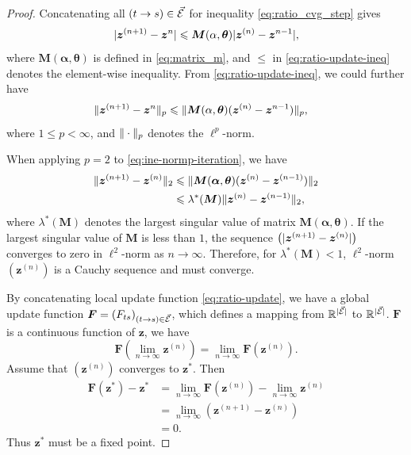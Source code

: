 \begin{proof}
  
  Concatenating all $(t\rightarrow s) \in \vec{\mathcal{E}}$ for inequality \eqref{eq:ratio_cvg_step} gives
  \begin{equation}\label{eq:ratio-update-ineq}
    | \bm{z}^{(n+1)} - \bm{z}^{n} | \leqslant \bm{M}(\alpha, \bm{\theta})| \bm{z}^{(n)} - \bm{z}^{n-1} |,
  \end{equation}
  where $\bm{M}(\bm{\alpha}, \bm{\theta})$ is defined in \eqref{eq:matrix_m}, and $\leq$ in \eqref{eq:ratio-update-ineq} denotes the element-wise inequality. From \eqref{eq:ratio-update-ineq}, we could further have
  \begin{align}\label{eq:ine-normp-iteration}
    \| \bm{z}^{(n+1)} - \bm{z}^{n} \|_{p} &\leqslant \| \bm{M}(\alpha, \bm{\theta})(\bm{z}^{(n)} - \bm{z}^{n-1}) \|_{p},               
  \end{align}
  where $1\leq p < \infty$, and $\| \cdot \|_p$ denotes the ${\ell}^p$-norm.

  When applying $p=2$ to \eqref{eq:ine-normp-iteration}, we have
  \begin{align}\label{eq:ieq-largest-singular}
    \| \bm{z}^{(n+1)} - \bm{z}^{(n)} \|_{2} &\leqslant \| \bm{M}(\bm{\alpha}, \bm{\theta})(\bm{z}^{(n)} - \bm{z}^{(n-1)}) \|_{2} \nonumber \\
                                          &\leqslant \lambda^{\ast}(\bm{M})\| \bm{z}^{(n)} - \bm{z}^{(n-1)} \|_{2},
  \end{align}
  where $\lambda^{\ast}(\bm{M})$ denotes the largest singular value of matrix
  $\bm{M}(\bm{\alpha}, \bm{\theta})$. If the largest singular value of $\bm{M}$ is less than $1$, the sequence
  $\left( | \bm{z}^{(n+1)} - \bm{z}^{(n)} |\right)$ converges to zero in $\ell^2$-norm as $n \rightarrow \infty$. Therefore, for $\lambda^{\ast}(\bm{M})<1$, $\ell^2$-norm $\left(  \bm{z}^{(n)}  \right)$ is a Cauchy sequence and must converge. 

  By concatenating local update function \eqref{eq:ratio-update}, we have a global update function $\bm{F} = \left(  F_{ts}  \right)_{ (t \rightarrow s) \in \vec{\mathcal{E}}}$, which defines a mapping from $\mathbb{R}^{| \vec{\mathcal{E}} |}$ to $\mathbb{R}^{| \vec{\mathcal{E}} |}$. $\bm{F}$ is a continuous function of $\bm{z}$, we have
  \begin{equation}
    \bm{F}(\lim_{n\rightarrow \infty}\bm{z}^{(n)}) = \lim_{n\rightarrow \infty}\bm{F}(\bm{z}^{(n)}).
  \end{equation}
  Assume that $\left(  \bm{z}^{(n)} \right)$ converges to
  $\bm{z}^{\ast}$. Then
  \begin{align}
    \bm{F}(\bm{z}^{\ast}) - \bm{z}^{\ast}
    &= \lim_{n\rightarrow \infty} \bm{F}(\bm{z}^{(n)}) -\lim_{n\rightarrow
      \infty} \bm{z}^{(n)} \nonumber \\
    &= \lim_{n\rightarrow \infty} (\bm{z}^{(n+1)} - \bm{z}^{(n)}) \nonumber \\
    &= 0.
  \end{align}
  Thus $\bm{z}^{\ast}$ must be a fixed point.


\end{proof}
